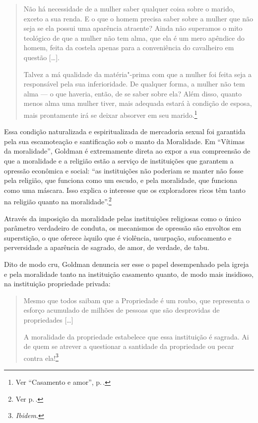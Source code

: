 \begin{quote}
Não há necessidade de a mulher saber
qualquer coisa sobre o marido, exceto a sua renda. E o que o homem
precisa saber sobre a mulher que não seja se ela possui uma aparência
atraente? Ainda não superamos o mito teológico de que a mulher não tem
alma, que ela é um mero apêndice do homem, feita da costela apenas para
a conveniência do cavalheiro em questão {[}\ldots{]}.

Talvez a má qualidade da matéria"-prima com que a mulher foi feita seja a
responsável pela sua inferioridade. De qualquer forma, a mulher não tem
alma --- o que haveria, então, de se saber sobre ela? Além disso, quanto
menos alma uma mulher tiver, mais adequada estará à condição de esposa,
mais prontamente irá se deixar absorver em seu marido.\footnote{Ver ``Casamento e amor'', p.\,\pageref{ref7}.}
\end{quote}

Essa condição naturalizada e espiritualizada de mercadoria
sexual foi garantida pela sua escamoteação e santificação sob o manto
da Moralidade. Em ``Vítimas da moralidade'', Goldman é extremamente
direta ao expor a sua compreensão de que a moralidade e a religião estão a
serviço de instituições que garantem a opressão econômica e social:
``as instituições não poderiam se manter não
fosse pela religião, que funciona como um escudo, e pela moralidade, que
funciona como uma máscara. Isso explica o interesse que os exploradores
ricos têm tanto na religião quanto na moralidade''.\footnote{Ver p.\,\pageref{ref8}.} 

Através da
imposição da moralidade pelas instituições religiosas como o único
parâmetro verdadeiro de conduta, os mecanismos de opressão são envoltos
em superstição, o que oferece àquilo que é violência,
usurpação, sufocamento e perversidade a aparência de sagrado, de amor, de
verdade, de tabu.

Dito de modo cru, Goldman denuncia ser esse o papel
desempenhado pela igreja e pela moralidade tanto na
instituição casamento quanto, de modo mais insidioso, na
instituição propriedade privada:

\begin{quote}
Mesmo que todos saibam que a
Propriedade é um roubo, que representa o esforço acumulado de milhões de
pessoas que são desprovidas de propriedades {[}\ldots{]}

A moralidade da propriedade estabelece que essa
instituição é sagrada. Ai de quem se atrever a questionar a santidade da
propriedade ou pecar contra ela!\footnote{\textit{Ibidem}.} 
\end{quote}

